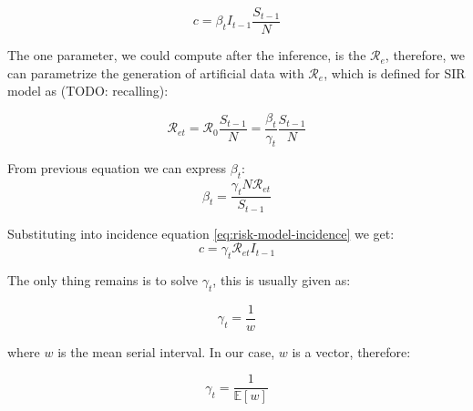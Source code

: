 \documentclass[
  digital, %
  oneside, %
  lof,     %
  lot,     %
]{fithesis4}
\begin{document}
\begin{equation}
  \label{eq:risk-model-incidence}
  c = \beta_t I_{t-1} \frac{S_{t-1}}{N}
\end{equation}

The one parameter, we could compute after the inference, 
is the $\mathcal{R}_e$, therefore, we can parametrize 
the generation of artificial data with $\mathcal{R}_e$, which
is defined for SIR model as (TODO: recalling):

\begin{equation}\label{eq:risk-model-rt}
\mathcal{R}_{et} = \mathcal{R}_0 \frac{S_{t-1}}{N} = \frac{\beta_t}{\gamma_t} \frac{S_{t-1}}{N}
\end{equation}

From previous equation we can express $\beta_t$:
\begin{equation}
\beta_t = \frac{\gamma_t N \mathcal{R}_{et}}{S_{t-1}}
\end{equation}

Substituting into incidence equation \eqref{eq:risk-model-incidence} we get:
\begin{equation}
  c = \gamma_t \mathcal{R}_{et} I_{t-1}
\end{equation}

The only thing remains is to solve $\gamma_t$, this is usually given as:

\begin{equation}
  \gamma_t = \frac{1}{w}
\end{equation}

where $w$ is the mean serial interval. In our case, $w$ is a vector, therefore:

\begin{equation}
  \gamma_t = \frac{1}{\mathbb{E}[w]}
\end{equation}


\end{document}
